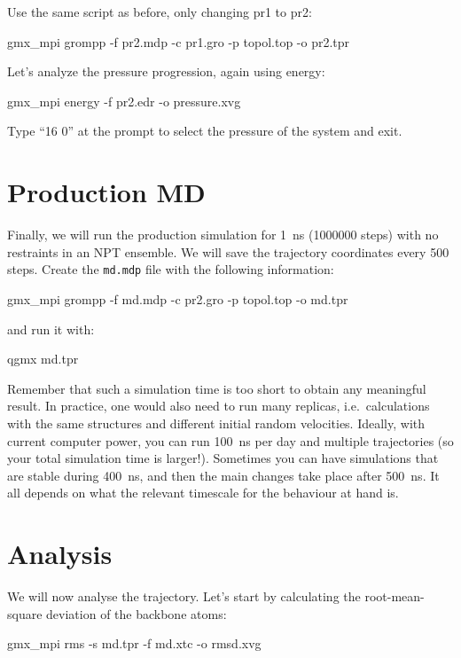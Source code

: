 \documentclass[10pt]{article}
\begin{document}
Use the same script as before, only changing pr1 to pr2:

\begin{cmdline}
gmx_mpi grompp -f pr2.mdp -c pr1.gro -p topol.top -o pr2.tpr
\end{cmdline}

Let's analyze the pressure progression, again using energy:
\begin{cmdline}
gmx_mpi energy -f pr2.edr -o pressure.xvg
\end{cmdline}

Type ``16 0'' at the prompt to select the pressure of the system and exit. 


\section{Production MD}
Finally,  we will run the production simulation for 1~ns (1000000 steps) with no restraints in an NPT ensemble. We will save the trajectory coordinates every 500 steps. Create the \texttt{md.mdp} file with the following information:
 
\begin{cmdline}
gmx_mpi grompp -f md.mdp -c pr2.gro -p topol.top -o md.tpr
\end{cmdline}

and run it with:

\begin{cmdline}
qgmx md.tpr
\end{cmdline}

Remember that such a simulation time is too short to obtain any meaningful result. In practice, one would also need to run many replicas, i.e.\ calculations with the same structures and different initial random velocities. Ideally, with current computer power, you can run 100~ns per day and multiple trajectories (so your total simulation time is larger!). Sometimes you can have simulations that are stable during 400~ns, and then the main changes take place after 500~ns. It all depends on what the relevant timescale for the behaviour at hand is.

\section{Analysis}
We will now analyse the trajectory. Let's start by calculating the root-mean-square deviation of the backbone atoms:
\begin{cmdline}
gmx_mpi rms -s md.tpr -f md.xtc -o rmsd.xvg
\end{cmdline}
\end{document}

